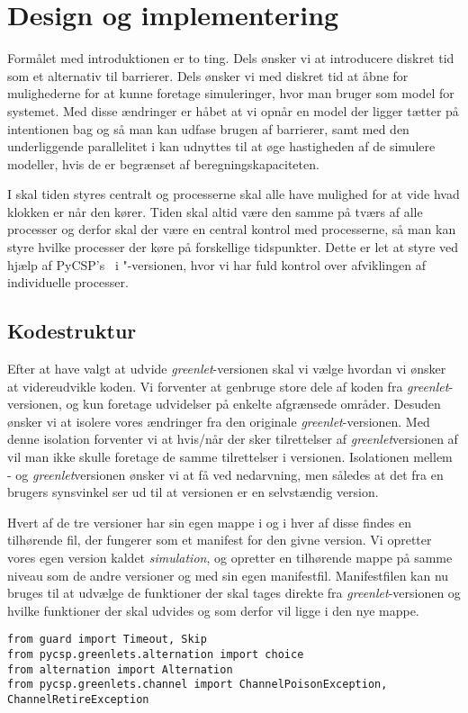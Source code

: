 
\section{Design og implementering}
Formålet med introduktionen er to ting. Dels ønsker vi at introducere diskret tid som et alternativ til barrierer. Dels ønsker vi med diskret tid at åbne for mulighederne for at kunne foretage simuleringer, hvor man bruger \csp som model for systemet. Med disse ændringer er håbet at vi opnår en model der ligger tætter på intentionen bag \csp og så man kan udfase brugen af barrierer, samt med den underliggende parallelitet i \csp kan udnyttes til at øge hastigheden af de simulere modeller, hvis de er begrænset af beregningskapaciteten.

I \des  skal tiden styres centralt og processerne skal alle have mulighed for at vide hvad klokken er når den kører. Tiden skal altid være den samme på tværs af alle processer og derfor skal der være en central kontrol med processerne, så man kan styre hvilke processer der køre på forskellige tidspunkter. Dette er let at styre ved hjælp af PyCSP's \sched ~i "-versionen, hvor vi har fuld kontrol over afviklingen af individuelle processer. 


\subsection{Kodestruktur}  
Efter at have valgt at udvide \emph{greenlet}-versionen skal vi vælge hvordan vi ønsker at videreudvikle koden. Vi forventer at genbruge store dele af koden fra \emph{greenlet}-versionen, og kun foretage udvidelser på enkelte afgrænsede områder. Desuden ønsker vi at isolere vores ændringer fra den originale \emph{greenlet}-versionen. Med denne isolation forventer vi at hvis/når der sker tilrettelser af \emph{greenlet}versionen af \pycsp vil man ikke skulle foretage de samme tilrettelser i \des versionen. 
Isolationen mellem \des- og \emph{greenlet}versionen ønsker vi at få ved nedarvning, men således at det fra en brugers synsvinkel ser ud til at \des versionen er en selvstændig version.

Hvert af de tre versioner har sin egen mappe i \pycsp og i hver af disse findes en tilhørende  fil, der fungerer som et manifest for den givne version. Vi opretter vores egen version kaldet \emph{simulation}, og opretter en tilhørende mappe på samme niveau som de andre versioner og med sin egen manifestfil. Manifestfilen kan nu bruges til at udvælge de funktioner der skal tages direkte fra \emph{greenlet}-versionen og hvilke funktioner der skal udvides og som derfor vil ligge i den nye mappe.
\begin{lstlisting}[float=hbtp,label=fig:init,caption=Uddrag af \code{\_\_init\_\_.py} for simulationsversionen.]
from guard import Timeout, Skip
from pycsp.greenlets.alternation import choice
from alternation import Alternation
from pycsp.greenlets.channel import ChannelPoisonException, ChannelRetireException
\end{lstlisting}

